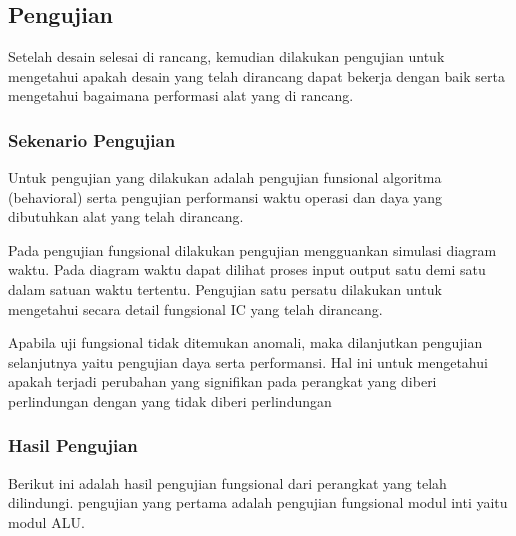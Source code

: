 \chapter{\babEmpat}

\section{Pengujian}
Setelah desain selesai di rancang, kemudian dilakukan pengujian untuk mengetahui apakah desain yang telah dirancang dapat bekerja dengan baik serta mengetahui bagaimana performasi alat yang di rancang.

\subsection{Sekenario Pengujian}
Untuk pengujian yang dilakukan adalah pengujian funsional algoritma (behavioral) serta pengujian performansi waktu operasi dan daya yang dibutuhkan alat yang telah dirancang.

Pada pengujian fungsional dilakukan pengujian mengguankan simulasi diagram waktu. Pada diagram waktu dapat dilihat proses input output satu demi satu dalam satuan waktu tertentu. Pengujian satu persatu dilakukan untuk mengetahui secara detail fungsional IC yang telah dirancang.

Apabila uji fungsional tidak ditemukan anomali, maka dilanjutkan pengujian selanjutnya yaitu pengujian daya serta performansi. Hal ini untuk mengetahui apakah terjadi perubahan yang signifikan pada perangkat yang diberi perlindungan dengan yang tidak diberi perlindungan

\subsection{Hasil Pengujian}
Berikut ini adalah hasil pengujian fungsional dari perangkat yang telah dilindungi. pengujian yang pertama adalah pengujian fungsional  modul inti yaitu modul ALU.

